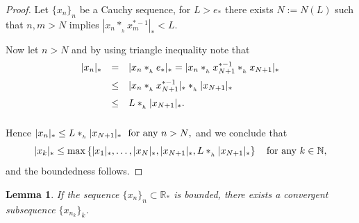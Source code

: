 \documentclass[10pt]{amsart}
\newtheorem{lemma}{Lemma}
\numberwithin{equation}{section}
\begin{document}
\begin{proof}

Let $\{x_{n}\}_{n}$ be a Cauchy sequence, for  $L>e_{\ast}$ there exists $N:=N(L)$ such that
$ n,m>N $ implies $|x_{n}\ast_{_h}x_{m}^{\ast-1}|_{\ast}<L.$

\medskip

\noindent Now let $n>N$ and by using triangle inequality note that
\begin{displaymath}
\begin{array}{rcl}
\medskip
|x_{n}|_{\ast} & = & |x_{n}\ast_{_h} e_{\ast}|_* 
               = |x_{n}\ast_{_h} x_{N+1}^{\ast-1}\ast_{_h} x_{N+1}|_{\ast} \\
               \medskip
               & \leq & |x_{n}\ast_{_h} x_{N+1}^{\ast-1}|_{\ast} \ast_{_h} |x_{N+1}|_{\ast}  \\
               \medskip
               & \leq & L\ast_{_h} |x_{N+1}|_{\ast}.
\end{array}    
\end{displaymath}

Hence  
$
|x_{n}|_{\ast}  \leq  L \ast_{_h} |x_{N+1}|_{\ast}  \ \ \textnormal{for any $n>N$},
$
and we conclude that
$$
|x_{k}|_{\ast}\leq \max\left\{|x_{1}|_{\ast},\ldots,|x_{N}|_{\ast},|x_{N+1}|_{\ast},L \ast_{_h} |x_{N+1}|_{\ast}\right\} \quad\textnormal{for any $k\in \mathbb{N}$},
$$
and the boundedness follows.

\end{proof}

\begin{lemma}
\label{BW}
If the sequence $\{x_{n}\}_{n}\subset \mathbb{R}_*$ is bounded, there exists a convergent
subsequence $\{x_{n_{k}}\}_{k}$.
\end{lemma}
\end{document}
